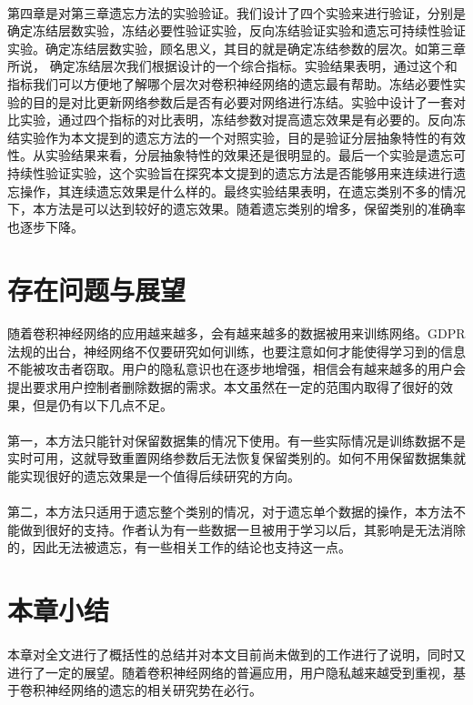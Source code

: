 \paragraph{}第四章是对第三章遗忘方法的实验验证。我们设计了四个实验来进行验证，分别是确定冻结层数实验，冻结必要性验证实验，反向冻结验证实验和遗忘可持续性验证实验。确定冻结层数实验，顾名思义，其目的就是确定冻结参数的层次。如第三章所说， 确定冻结层次我们根据设计的一个综合指标。实验结果表明，通过这个和指标我们可以方便地了解哪个层次对卷积神经网络的遗忘最有帮助。冻结必要性实验的目的是对比更新网络参数后是否有必要对网络进行冻结。实验中设计了一套对比实验，通过四个指标的对比表明，冻结参数对提高遗忘效果是有必要的。反向冻结实验作为本文提到的遗忘方法的一个对照实验，目的是验证分层抽象特性的有效性。从实验结果来看，分层抽象特性的效果还是很明显的。最后一个实验是遗忘可持续性验证实验，这个实验旨在探究本文提到的遗忘方法是否能够用来连续进行遗忘操作，其连续遗忘效果是什么样的。最终实验结果表明，在遗忘类别不多的情况下，本方法是可以达到较好的遗忘效果。随着遗忘类别的增多，保留类别的准确率也逐步下降。
\section{存在问题与展望}
\paragraph{}随着卷积神经网络的应用越来越多，会有越来越多的数据被用来训练网络。GDPR法规的出台，神经网络不仅要研究如何训练，也要注意如何才能使得学习到的信息不能被攻击者窃取。用户的隐私意识也在逐步地增强，相信会有越来越多的用户会提出要求用户控制者删除数据的需求。本文虽然在一定的范围内取得了很好的效果，但是仍有以下几点不足。
\paragraph{}第一，本方法只能针对保留数据集的情况下使用。有一些实际情况是训练数据不是实时可用，这就导致重置网络参数后无法恢复保留类别的。如何不用保留数据集就能实现很好的遗忘效果是一个值得后续研究的方向。
\paragraph{}第二，本方法只适用于遗忘整个类别的情况，对于遗忘单个数据的操作，本方法不能做到很好的支持。作者认为有一些数据一旦被用于学习以后，其影响是无法消除的，因此无法被遗忘，有一些相关工作\cite{2018arXiv181205159T}的结论也支持这一点。
\section{本章小结}
\paragraph{}本章对全文进行了概括性的总结并对本文目前尚未做到的工作进行了说明，同时又进行了一定的展望。随着卷积神经网络的普遍应用，用户隐私越来越受到重视，基于卷积神经网络的遗忘的相关研究势在必行。